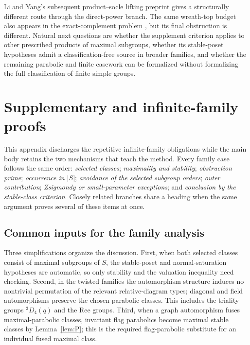 \documentclass[11pt]{amsart}
\theoremstyle{definition}
\theoremstyle{remark}
\begin{document}
Li and Yang's subsequent product--socle lifting preprint \cite{LiYang2026}
gives a structurally different route through the direct-power branch. The same
wreath-top budget also appears in the exact-complement problem
\cite{Sater1868}, but its final obstruction is different. Natural next
questions are whether the supplement criterion applies to other prescribed
products of maximal subgroups, whether its stable-poset hypotheses admit a
classification-free source in broader families, and whether the remaining
parabolic and finite casework can be formalized without formalizing the full
classification of finite simple groups.


\appendix

\section{Supplementary and infinite-family proofs}\label{app:families}

This appendix discharges the repetitive infinite-family obligations while the
main body retains the two mechanisms that teach the method. Every family case follows the same
order: \emph{selected classes}; \emph{maximality and
stability}; \emph{obstruction prime}; \emph{occurrence in $|S|$};
\emph{avoidance of the selected subgroup orders}; \emph{outer contribution};
\emph{Zsigmondy or small-parameter exceptions}; and \emph{conclusion by the
stable-class criterion}. Closely related branches share a heading when the
same argument proves several of these items at once.


\subsection*{Common inputs for the family analysis}\label{app:common-inputs}

Three simplifications organize the discussion. First, when both selected classes
consist of maximal subgroups of $S$, the stable-poset and normal-saturation
hypotheses are automatic, so only stability and the valuation inequality need
checking. Second, in the twisted families the automorphism structure induces
no nontrivial permutation of the relevant relative-diagram types; diagonal
and field automorphisms preserve the chosen parabolic classes. This includes
the triality groups ${}^3D_4(q)$ and the Ree groups. Third, when a graph
automorphism fuses maximal-parabolic classes, invariant flag parabolics become
maximal stable classes by Lemma~\ref{lem:P}; this is the required
flag-parabolic substitute for an individual fused maximal class.
\end{document}
